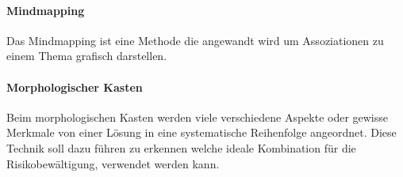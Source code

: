 \paragraph{Mindmapping}
Das Mindmapping ist eine Methode die angewandt wird um Assoziationen zu einem Thema grafisch darstellen.

\paragraph{Morphologischer Kasten}
Beim morphologischen Kasten werden viele verschiedene Aspekte oder gewisse Merkmale von einer Lösung in eine systematische Reihenfolge angeordnet. Diese Technik soll dazu führen zu erkennen welche ideale Kombination für die Risikobewältigung, verwendet werden kann.
